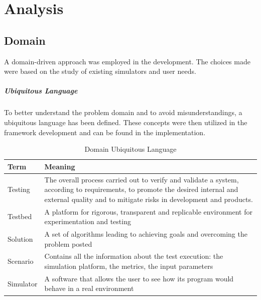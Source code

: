 \documentclass[12pt,a4paper,openright,twoside]{book}
\begin{document}
\chapter{Analysis}

\section{Domain}

A domain-driven approach was employed in the development. The choices made were based on the study of existing simulators and user needs. 

\paragraph{Ubiquitous Language}

To better understand the problem domain and to avoid misunderstandings, a ubiquitous language has been defined.
These concepts were then utilized in the framework development and can be found in the implementation.

\begin{table}[H]
    \centering
    \begin{tabular}{|l|p{}|}
    \toprule
    \textbf{Term} & \textbf{Meaning} \\
    \midrule                                                                                                                                                              
    Testing & The overall process carried out to verify and validate a system, according to requirements, to promote the desired internal and external quality and to mitigate risks in development and products. \\ \hline
    Testbed & A platform for rigorous, transparent and replicable environment for experimentation and testing \\ \hline
    Solution & A set of algorithms leading to achieving goals and overcoming the problem posted \\ \hline
    Scenario & Contains all the information about the test execution: the simulation platform, the metrics, the input parameters \\ \hline
    Simulator & A software that allows the user to see how its program would behave in a real environment \\ \hline
    \end{tabular}
    \caption{Domain Ubiquitous Language}
    \end{table}
\end{document}
